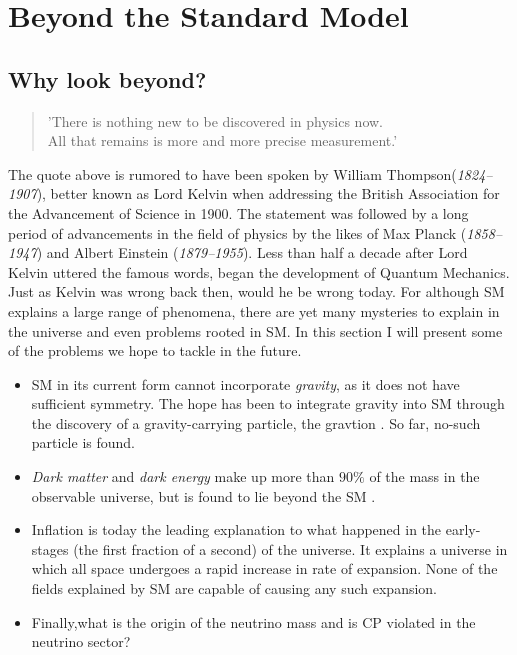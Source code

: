 \section{Beyond the Standard Model}
\subsection{Why look beyond?}
\begin{center}
    \hyphenblockcquote{UKenglish}{Kelvin}{
        'There is nothing new to be discovered in physics now.\\
        All that remains is more and more precise measurement.'
        }
\end{center}
The quote above is rumored to have been spoken by William Thompson(\emph{1824–1907}), better
known as Lord Kelvin when addressing the British Association for the Advancement
of Science in 1900. The statement was followed by a long period of advancements in the
field of physics by the likes of Max Planck (\emph{1858–1947}) and 
Albert Einstein (\emph{1879–1955}). Less than half a decade after Lord Kelvin
uttered the famous words, began the development of Quantum Mechanics. 
Just as Kelvin was wrong back then, would he be wrong today. For although \ac{SM} explains 
a large range of phenomena, there are yet many mysteries to explain in the universe and even 
problems rooted in \ac{SM}. In this section I will present some of the problems we hope to 
tackle in the future. 
\begin{itemize}
    \item \ac{SM} in its current form cannot incorporate \emph{gravity}, as it does not have sufficient symmetry. 
    The hope has been to integrate gravity into \ac{SM} through the discovery of a gravity-carrying particle, 
    the gravtion \cite{Graviton}. So far, no-such particle is found.
    \item \emph{Dark matter} and \emph{dark energy} make up more than $90\%$ of the mass in the observable universe,
    but is found to lie beyond the \ac{SM} \cite{DarkME}.
    \item Inflation is today the leading explanation to what happened in the early-stages
    (the first fraction of a second) of the universe. It explains a universe in which all space
    undergoes a rapid increase in rate of expansion. None of the fields explained by \ac{SM} are 
    capable of causing any such expansion.
    \item Finally,what is the origin of the neutrino 
    mass and is \ac{CP} violated in the neutrino sector? 
\end{itemize}
